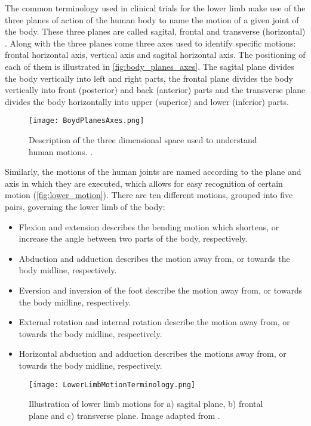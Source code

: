The common terminology used in clinical trials for the lower limb make use of the three planes of action of the human body to name the motion of a given joint of the body. These three planes are called sagital, frontal and transverse (horizontal) \cite{PhysicalSolutions2016}. Along with the three planes come three axes used to identify specific motions: frontal horizontal axis, vertical axis and sagital horizontal axis. The positioning of each of them is illustrated in \autoref{fig:body_planes_axes}. The sagital plane divides the body vertically into left and right parts, the frontal plane divides the body vertically into front (posterior) and back (anterior) parts and the transverse plane divides the body horizontally into upper (superior) and lower (inferior) parts.

\begin{figure}[htbp!]
    \centering
    \texttt{[image: BoydPlanesAxes.png]}
    \caption{Description of the three dimensional space used to understand human motions. \cite{PhysicalSolutions2016}. }
    \label{fig:body_planes_axes}
\end{figure}

Similarly, the motions of the human joints are named according to the plane and axis in which they are executed, which allows for easy recognition of certain motion (\autoref{fig:lower_motion}). There are ten different motions, grouped into five pairs, governing the lower limb of the body:
\begin{itemize}
    \item Flexion and extension describes the bending motion which shortens, or increase the angle between two parts of the body, respectively.
    \item Abduction and adduction describes the motion away from, or towards the body midline, respectively.
    \item Eversion and inversion of the foot describe the motion away from, or towards the body midline, respectively.
    \item External rotation and internal rotation describe the motion away from, or towards the body midline, respectively.
    \item Horizontal abduction and adduction describes the motions away from, or towards the body midline, respectively.
\end{itemize}

\begin{figure}[htbp!]
    \centering
    \texttt{[image: LowerLimbMotionTerminology.png]}
    \caption{Illustration of lower limb motions for a) sagital plane, b) frontal plane and c) transverse plane. Image adapted from  \cite{PhysicalSolutions2016}. }
    \label{fig:lower_motion}
\end{figure}

